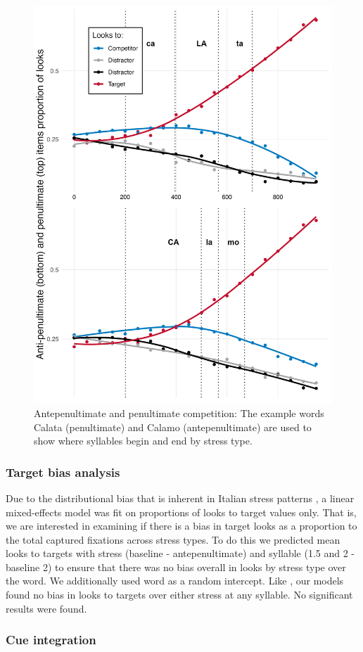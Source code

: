 \begin{figure}[H]
  \centering
  \includegraphics[width=0.6\linewidth]{visuals/pen_vs_anti_pen.jpeg} %
  \caption{Antepenultimate and penultimate competition: The example words Calata (penultimate) and Calamo (antepenultimate) are used to show where syllables begin and end by stress type.}
  \label{fig:raw_pen_vs_anti}
\end{figure}

\subsubsection{Target bias analysis}

Due to the distributional bias that is inherent in Italian stress patterns \cite{Sulpizio_McQueen_2012}, a linear mixed-effects model was fit on proportions of looks to target values only. That is, we are interested in examining if there is a bias in target looks as a proportion to the total captured fixations across stress types. To do this we predicted mean looks to targets with stress (baseline - antepenultimate) and syllable (1.5 and 2 - baseline 2) to ensure that there was no bias overall in looks by stress type over the word. We additionally used word as a random intercept. Like \cite{Sulpizio_McQueen_2012}, our models found no bias in looks to targets over either stress at any syllable. No significant results were found.   


\subsubsection{Cue integration}

